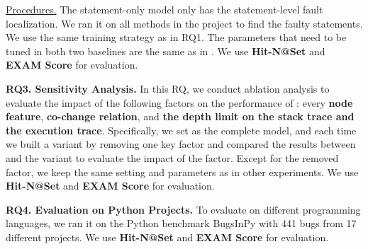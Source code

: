 
\underline{Procedures.}
The statement-only model only has the statement-level fault
localization. We ran it on all methods in the project to find the
faulty statements. We use the same training strategy as in RQ1.  The
parameters that need to be tuned in both two baselines are the same as
in {\tool}. We use \textbf{Hit-N@Set} and \textbf{EXAM Score} for
evaluation.

{\bf RQ3. Sensitivity Analysis.}  In this RQ, we conduct ablation
analysis to evaluate the impact of the following factors on the
performance of {\tool}: every {\bf node feature}, {\bf co-change
relation}, and {\bf the depth limit on the stack trace and the
execution trace}. Specifically, we set \tool as the complete model,
and each time we built a variant by removing one key factor and
compared the results between {\tool} and the variant to evaluate
the impact of the factor. Except for the removed factor, we keep the
same setting and parameters as in other experiments. We
use \textbf{Hit-N@Set} and \textbf{EXAM Score} for evaluation.

{\bf RQ4. Evaluation on Python Projects.}
%
To evaluate {\tool} on different programming languages, we ran it on the Python benchmark BugsInPy \cite{BugsInPy,widyasari2020bugsinpy} with 441 bugs from 17 different projects. We use \textbf{Hit-N@Set} and \textbf{EXAM Score} for evaluation.
